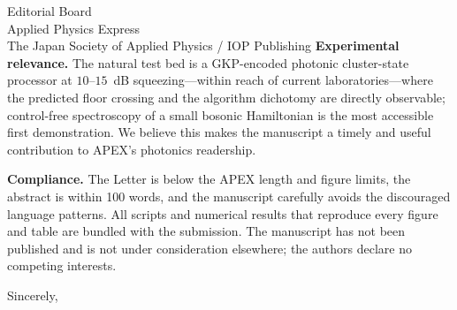 \documentclass[11pt]{letter}
\begin{document}
\begin{letter}{Editorial Board \\ Applied Physics Express \\
The Japan Society of Applied Physics / IOP Publishing}
\textbf{Experimental relevance.} The natural test bed is a GKP-encoded
photonic cluster-state processor at $10$--$15$~dB squeezing---within
reach of current laboratories---where the predicted floor crossing and
the algorithm dichotomy are directly observable; control-free
spectroscopy of a small bosonic Hamiltonian is the most accessible first
demonstration. We believe this makes the manuscript a timely and useful
contribution to APEX's photonics readership.

\textbf{Compliance.} The Letter is below the APEX length and figure
limits, the abstract is within 100 words, and the manuscript carefully
avoids the discouraged language patterns. All scripts and numerical
results that reproduce every figure and table are bundled with the
submission. The manuscript has not been published and is not under
consideration elsewhere; the authors declare no competing interests.

\closing{Sincerely,}

\end{letter}
\end{document}
